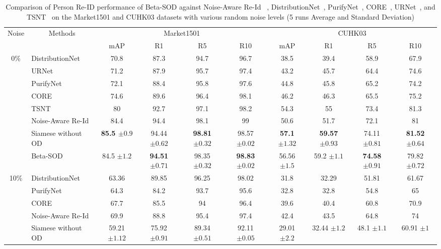 \documentclass[lettersize,journal]{IEEEtran}
\begin{document}
\begin{table}[ht]
\caption{
Comparison of Person Re-ID performance of Beta-SOD against Noise-Aware Re-Id ~\cite{21}, DistributionNet~\cite{19}, PurifyNet~\cite{20}, CORE~\cite{22}, URNet~\cite{URNet}, and TSNT~\cite{23} on the Market1501 and CUHK03 datasets with various random noise levels (5 runs Average and Standard Deviation)}
\resizebox{\textwidth}{!}
{\centering
\begin{tabular}{c|l|cccc|cccc}
\hline
\multirow{2}{*}{Noise} & \multicolumn{1}{c|}{\multirow{2}{*}{Methods}} & \multicolumn{4}{c|}{Market1501} & \multicolumn{4}{c}{CUHK03} \\ \cline{3-10} 
 & \multicolumn{1}{c|}{} & mAP & R1 & R5 & R10 & mAP & R1 & R5 & R10 \\ \hline
\multirow{8}{*}{0\%} & DistributionNet & 70.8 & 87.3 & 94.7 & 96.7 & 38.5 & 39.4 & 58.9 & 67.9 \\
 & URNet & 71.2 & 87.9 & 95.7 & 97.4 & 43.2 & 45.7 & 64.4 & 74.6 \\
 & PurifyNet & 72.1 & 88.4 & 95.8 & 97.6 & 44.8 & 45.8 & 65.2 & 74.2 \\
 & CORE & 74.6 & 89.6 & 96.4 & 98.1 & 46.2 & 46.3 & 65.5 & 75.2 \\
 & TSNT & 80 & 92.7 & 97.1 & 98.2 & 54.3 & 55 & 73.4 & 81.3 \\
 & Noise-Aware Re-Id & 84.4 & 94.4 & 98.1 & 99 & 50.6 & 51.7 & 72.1 & 81 \\ \cline{2-10} 
 & Siamese without OD & \textbf{85.5 $\pm0.9$} & 94.44  $\pm0.62$ & \textbf{98.81 $\pm0.32$} & 98.57 $\pm0.02$ & \textbf{57.1 $\pm1.32$} & \textbf{59.57 $\pm0.93$} & 74.11 $\pm0.81$ & \textbf{81.52 $\pm0.64$} \\
 & Beta-SOD & 84.5 $\pm1.2$ & \textbf{94.51 $\pm0.71$} & 98.35 $\pm0.32$ & \textbf{98.83 $\pm0.02$} & 56.56 $\pm1.5$ & 59.2 $\pm1.1$ & \textbf{74.58 $\pm0.91$} & 79.82 $\pm0.72$ \\ \hline
\multirow{6}{*}{10\%} & DistributionNet & 63.36 & 89.85 & 96.25 & 98.02 & 31.8 & 32.29 & 51.81 & 61.67 \\
 & PurifyNet & 64.3 & 84.2 & 93.7 & 95.6 & 32.8 & 32.8 & 54.8 & 65 \\
 & CORE & 67.7 & 85.5 & 94 & 96.4 & 39.6 & 40.4 & 60.8 & 70.9 \\
 & Noise-Aware Re-Id & 69.9 & 88.8 & 95.4 & 97.4 & 42.4 & 43.5 & 64.8 & 74 \\ \cline{2-10} 
 & Siamese without OD & 59.21 $\pm1.12$ & 75.92 $\pm0.91$ & 89.34 $\pm0.51$ & 92.11 $\pm0.05$ & 29.01 $\pm2.2$ & 32.44 $\pm1.2$ & 48.1 $\pm1.1$ & 60.91 $\pm1$ \\

\end{tabular}}
\end{table}
\end{document}
